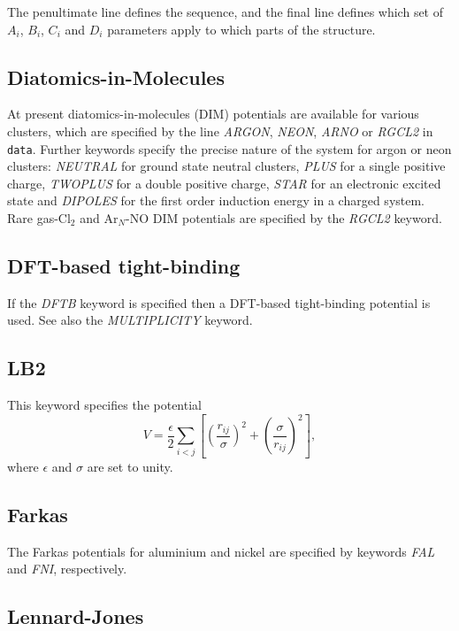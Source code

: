\documentclass[12pt,a4paper,dvips]{article}
\begin{document}
\noindent The penultimate line defines the sequence, and the final line
defines which set of $A_i$, $B_i$, $C_i$ and $D_i$ parameters apply to which 
parts of the structure.\cite{BrownFH03}


\subsection{Diatomics-in-Molecules}

At present diatomics-in-molecules (DIM) potentials are available for various
clusters, which are specified by the line {\it ARGON\/}, {\it NEON\/},
{\it ARNO} or {\it RGCL2\/} in {\tt data}.
Further keywords specify the precise nature of the system for argon or
neon clusters: {\it NEUTRAL\/} for ground state neutral
clusters, {\it PLUS\/} for a single positive charge, {\it TWOPLUS\/} for a double positive
charge, {\it STAR\/} for an electronic excited state and {\it DIPOLES\/} for the first order
induction energy in a charged system. Rare gas-Cl$_2$ and Ar$_N$-NO DIM potentials
are specified by the {\it RGCL2\/} keyword.

\subsection{DFT-based tight-binding}

If the {\it DFTB\/} keyword is specified then a DFT-based tight-binding potential
is used. See also the {\it MULTIPLICITY\/} keyword.

\subsection{LB2}

This keyword specifies the potential\cite{LB299a,LB299b,LB204}
\begin{equation}
V = \frac{\epsilon}{2} \sum_{i<j} \left[ \left(\frac{r_{ij}}{\sigma}\right)^2+
\left(\frac{\sigma}{r_{ij}}\right)^2\right],
\end{equation}
where $\epsilon$ and $\sigma$ are set to unity.

\subsection{Farkas}

The Farkas potentials for aluminium and nickel are specified by keywords {\it FAL\/} and
{\it FNI\/}, respectively.

\subsection{Lennard-Jones}
\end{document}
